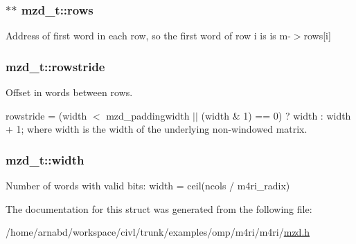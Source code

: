 \subsubsection[{rows}]{$\ast$$\ast$ mzd\+\_\+t\+::rows}\label{structmzd__t_ae809b9c25df0752caabe8233209dd447}
Address of first word in each row, so the first word of row i is is m-\/$>$rows\mbox{[}i\mbox{]} \hypertarget{structmzd__t_a0ce300dfa1c7802b69c96cf32105f322}{}
\subsubsection[{rowstride}]{ mzd\+\_\+t\+::rowstride}\label{structmzd__t_a0ce300dfa1c7802b69c96cf32105f322}


Offset in words between rows. 

rowstride = (width $<$ mzd\+\_\+paddingwidth $\vert$$\vert$ (width \& 1) == 0) ? width \+: width + 1; where width is the width of the underlying non-\/windowed matrix. \hypertarget{structmzd__t_a0e2ffa9253cfa52b2ee3d88a95be00a5}{}
\subsubsection[{width}]{ mzd\+\_\+t\+::width}\label{structmzd__t_a0e2ffa9253cfa52b2ee3d88a95be00a5}
Number of words with valid bits\+: width = ceil(ncols / m4ri\+\_\+radix) 

The documentation for this struct was generated from the following file\+:\begin{DoxyCompactItemize}
\item 
/home/arnabd/workspace/civl/trunk/examples/omp/m4ri/m4ri/\hyperlink{mzd_8h}{mzd.\+h}\end{DoxyCompactItemize}
